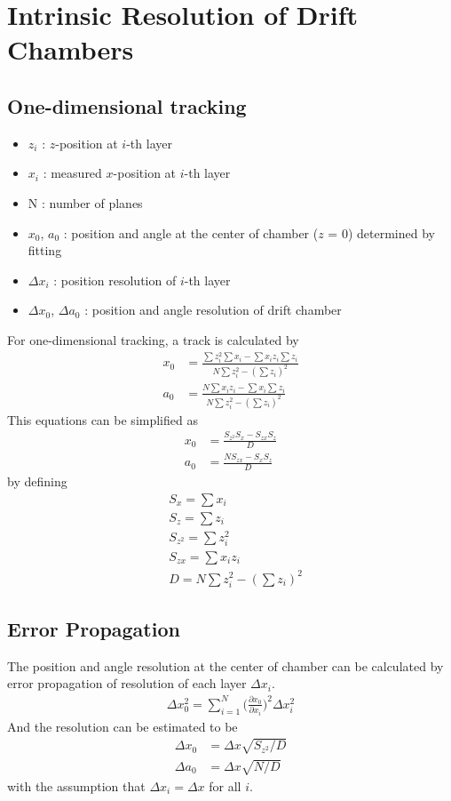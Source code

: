 \chapter{Intrinsic Resolution of Drift Chambers}
\section{One-dimensional tracking}

\begin{itemize}
    \item $z_i$ : $z$-position at $i$-th layer
    \item $x_i$ : measured $x$-position at $i$-th layer
    \item N : number of planes
    \item $x_0$, $a_0$ : position and angle at the center of chamber ($z$ = 0) determined by fitting
    \item $\Delta x_i$ : position resolution of $i$-th layer
    \item $\Delta x_0$, $\Delta a_0$ : position and angle resolution of drift chamber
\end{itemize}

For one-dimensional tracking, a track is calculated by
\begin{align}
    x_0 &= \frac{\sum z_i^2 \sum x_i - \sum x_iz_i \sum z_i}{N \sum z_i^2 - (\sum z_i)^2} \\ 
    a_0 &= \frac{N \sum x_iz_i - \sum x_i \sum z_i}{N \sum z_i^2 - (\sum z_i)^2}
\end{align}
This equations can be simplified as
\begin{align}
    x_0 &= \frac{S_{z^2} S_x - S_{zx} S_z}{D} \\
    a_0 &= \frac{N S_{zx} - S_x S_z}{D}
\end{align}
by defining
\begin{align}
    &S_x = \sum x_i\\ 
    &S_z = \sum z_i\\
    &S_{z^2} = \sum z_i^2\\
    &S_{zx} = \sum x_iz_i\\ 
    &D = N \sum z_i^2 - (\sum z_i)^2
\end{align}

\section{Error Propagation}
The position and angle resolution at the center of chamber can be calculated by error propagation of resolution of each layer $\Delta x_i$.
\begin{align}
    \Delta x_0^2 = \sum_{i=1}^N \bigg( \frac{\partial x_0}{\partial x_i} \bigg)^2 \Delta x_i^2
    \label{propagarion}
\end{align}
And the resolution can be estimated to be
\begin{align}
    \Delta x_0 &= \Delta x \sqrt{S_{z^2} / D} \\
    \Delta a_0 &= \Delta x \sqrt{N / D}
\end{align}
with the assumption that $\Delta x_i = \Delta x$ for all $i$.

